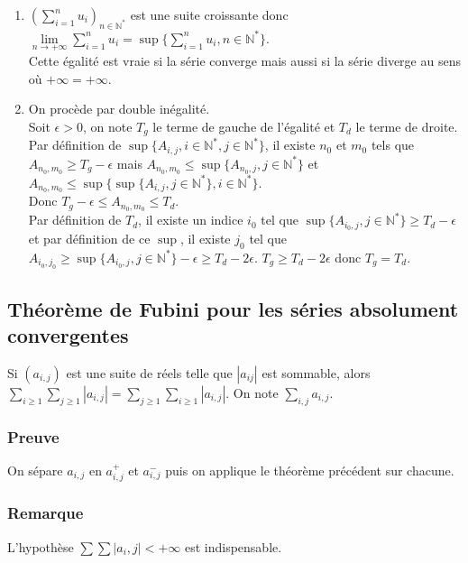 \documentclass[a4paper,10pt]{book} %
\newcommand{\N}{\mathbb{N}}
\newcommand\abs[1]{\left|#1\right|}
\begin{document}
\begin{enumerate}
\item $\displaystyle (\sum_{i=1}^nu_i)_{n\in\N^*}$ est une suite croissante donc $\displaystyle \lim\limits_{n\rightarrow +\infty}\sum_{i=1}^nu_i=\sup\{\sum_{i=1}^nu_i, n\in\N^* \}$.\\
Cette égalité est vraie si la série converge mais aussi si la série diverge au sens où $+\infty=+\infty$.

\item On procède par double inégalité.\\

Soit $\epsilon>0$, on note $T_g$ le terme de gauche de l'égalité et $T_d$ le terme de droite.\\

Par définition de $\sup\{A_{i,j}, i\in \N^*, j\in \N^* \}$, il existe $n_0$ et $m_0$ tels que $A_{n_0,m_0}\geq T_g-\epsilon$ mais $A_{n_0,m_0}\leq\sup\{A_{n_0,j}, j\in\N^*\}$ et $A_{n_0,m_0}\leq\sup\{ \sup\{ A_{i,j},j\in\N^* \}, i\in \N^* \}$.\\

Donc $T_g-\epsilon\leq A_{n_0,m_0}\leq T_d$.\\

Par définition de $T_d$, il existe un indice $i_0$ tel que $\sup\{ A_{i_0,j}, j\in \N^* \}\geq T_d-\epsilon$ et par définition de ce $\sup$, il existe $j_0$ tel que $A_{i_0,j_0}\geq \sup\{ A_{i_0,j}, j\in \N^* \}-\epsilon\geq T_d-2\epsilon$. $T_g\geq T_d-2\epsilon$ donc $T_g=T_d$.
\end{enumerate}

\subsection{Théorème de Fubini pour les séries absolument convergentes}
Si $(a_{i,j})$ est une suite de réels telle que $\abs{a_{ij}}$ est sommable, alors $\displaystyle \sum_{i\geq 1}\sum_{j\geq 1} \abs{a_{i,j}}=\sum_{j\geq 1}\sum_{i\geq 1} \abs{a_{i,j}}$. On note $\sum_{i,j}a_{i,j}$.

\subsubsection{Preuve}
On sépare $a_{i,j}$ en $a_{i,j}^+$ et $a_{i,j}^-$ puis on applique le théorème précédent sur chacune.

\subsubsection{Remarque}
L'hypothèse $\sum\sum\abs{a_i,j}<+\infty$ est indispensable.
\end{document}

